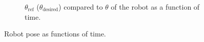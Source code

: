\begin{figure}
\begin{subfigure}[t]{0.32\columnwidth}
		\caption{$\theta_{\text{ref}}$ ($\theta_{\text{desired}}$) compared to $\theta$ of the robot as a function of time.}
        \label{fig:theta_time}
	\end{subfigure}
	\caption{Robot pose as functions of time.}
    \label{fig:x_y_theta_sub}
\end{figure}

